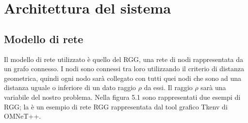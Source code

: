 \chapter{Architettura del sistema}
\label{chap:architettura}

\section{Modello di rete}
\label{sec:modello_rete}
Il modello di rete utilizzato è quello del \acf{RGG}, una rete di nodi rappresentata da un grafo connesso. I nodi sono connessi tra loro utilizzando il criterio di distanza geometrica, quindi ogni nodo sarà collegato con tutti quei nodi che sono ad una distanza uguale o inferiore di un dato raggio $\rho$ da essi. Il raggio $\rho$ sarà una variabile del nostro problema. Nella figura 5.1 sono rappresentati due esempi di \acs{RGG}; la  è un esempio di rete \acs{RGG} rappresentata dal tool grafico Tkenv di OMNeT++.
\medskip

